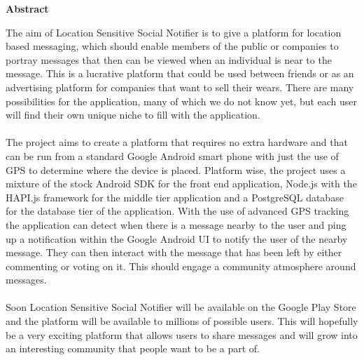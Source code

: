 \thispagestyle{empty}

\begin{center}
    {\LARGE\bf Abstract}
\end{center}

\noindent
The aim of Location Sensitive Social Notifier is to give a platform for location based messaging, which should enable members of the public or companies to portray messages that then can be viewed when an individual is near to the message. This is a lucrative platform that could be used between friends or as an advertising platform for companies that want to sell their wears. There are many possibilities for the application, many of which we do not know yet, but each user will find their own unique niche to fill with the application.\\
\\
The project aims to create a platform that requires no extra hardware and that can be run from a standard Google Android smart phone with just the use of GPS to determine where the device is placed. Platform wise, the project uses a mixture of the stock Android SDK \cite{Google:androidAPIDocs:2015:online} for the front end application, Node.js\cite{nodeteam:node:2015:online} with the HAPI.js\cite{hapiteam:hapti:2015:online} framework for the middle tier application and a PostgreSQL\cite{Postgres:APIDocumentation:2015:online} database for the database tier of the application. With the use of advanced GPS tracking the application can detect when there is a message nearby to the user and ping up a notification within the Google Android UI to notify the user of the nearby message. They can then interact with the message that has been left by either commenting or voting on it. This should engage a community atmosphere around messages.\\ 
\\
Soon Location Sensitive Social Notifier will be available on the Google Play Store and the platform will be available to millions of possible users. This will hopefully be a very exciting platform that allows users to share messages and will grow into an interesting community that people want to be a part of.